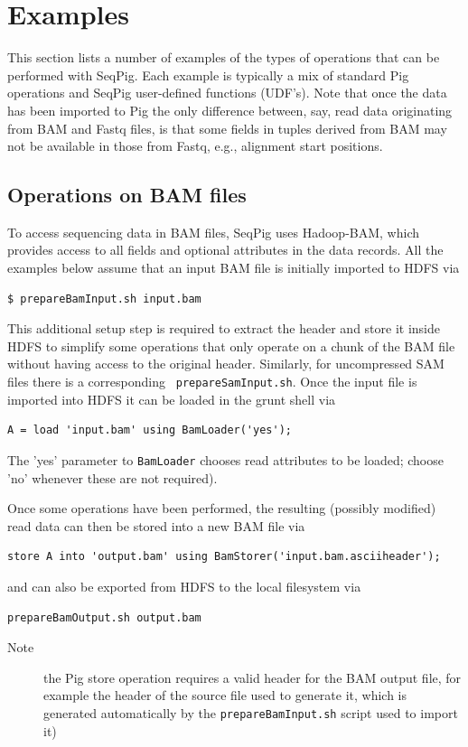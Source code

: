 
\section{Examples}
\label{sect:examples}

This section lists a number of examples of the types of operations
that can be performed with SeqPig. Each example is typically a mix of
standard Pig operations and SeqPig user-defined functions (UDF's).
Note that once the data has been imported to Pig the only difference
between, say, read data originating from BAM and Fastq files, is that
some fields in tuples derived from BAM may not be available in those
from Fastq, e.g., alignment start positions.

\subsection{Operations on BAM files}

To access sequencing data in BAM files, SeqPig uses Hadoop-BAM, which
provides access to all fields and optional attributes in the data
records. All the examples below assume that an input BAM file is
initially imported to HDFS via
\begin{lstlisting} 
$ prepareBamInput.sh input.bam
\end{lstlisting} 
This additional setup step is required to extract the header and store
it inside HDFS to simplify some operations that only operate on a
chunk of the BAM file without having access to the original header.
Similarly, for uncompressed SAM files there is a corresponding {\tt
prepareSamInput.sh}. Once the input file is imported into HDFS it
can be loaded in the grunt shell via
\begin{lstlisting} 
A = load 'input.bam' using BamLoader('yes');
\end{lstlisting} 
The 'yes' parameter to {\tt BamLoader} chooses read attributes to be
loaded; choose 'no' whenever these are not required).

Once some operations have been performed, the resulting (possibly
modified) read data can then be stored into a new BAM file via
\begin{lstlisting}
store A into 'output.bam' using BamStorer('input.bam.asciiheader');
\end{lstlisting}
and can also be exported from HDFS to the local filesystem via
\begin{lstlisting}
prepareBamOutput.sh output.bam
\end{lstlisting}
\begin{description}
	\item[Note] the Pig store operation requires a valid header for the BAM output file,
for example the header of the source file used to generate it, which is
generated automatically by the {\tt prepareBamInput.sh} script used to import it)
\end{description}

